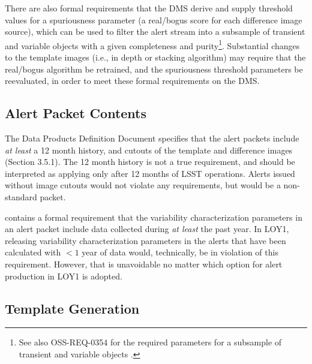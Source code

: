 \documentclass[DM,lsstdraft,toc]{lsstdoc}
\begin{document}
There are also formal requirements that the DMS derive and supply threshold values for a spuriousness parameter (a real/bogus score for each difference image source), which can be used to filter the alert stream into a subsample of transient and variable objects with a given completeness and purity\footnote{See also OSS-REQ-0354 for the required parameters for a subsample of transient and variable objects .}.
Substantial changes to the template images (i.e., in depth or stacking algorithm) may require that the real/bogus algorithm be retrained, and the spuriousness threshold parameters be reevaluated, in order to meet these formal requirements on the DMS. 

\subsection{Alert Packet Contents}\label{ssec:req_apc}

The Data Products Definition Document  specifies that the alert packets include {\em at least} a 12 month history, and cutouts of the template and difference images (Section 3.5.1).
The 12 month history is not a true requirement, and should be interpreted as applying only after 12 months of LSST operations.
Alerts issued without image cutouts would not violate any requirements, but would be a non-standard packet. 

 contains a formal requirement that the variability characterization parameters in an alert packet include data collected during {\em at least} the past year.
In LOY1, releasing variability characterization parameters in the alerts that have been calculated with $<1$ year of data would, technically, be in violation of this requirement.
However, that is unavoidable no matter which option for alert production in LOY1 is adopted.

\subsection{Template Generation}\label{ssec:req_temp}
\end{document}

